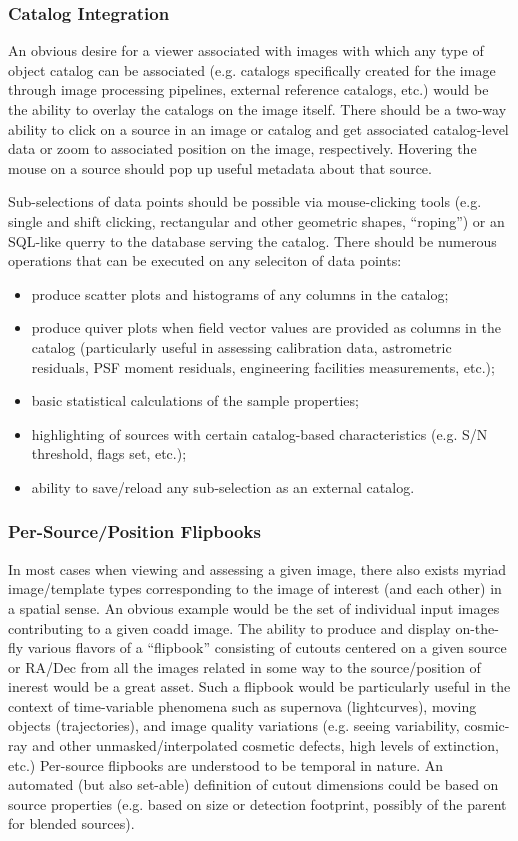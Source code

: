 \subsubsection{Catalog Integration}
An obvious desire for a viewer associated with images with which any type of object catalog can be associated (e.g. catalogs specifically created for the image through image processing pipelines, external reference catalogs, etc.) would be the ability to overlay the catalogs on the image itself.  There should be a two-way ability to click on a source in an image or catalog and get associated catalog-level data or zoom to associated position on the image, respectively.  Hovering the mouse on a source should pop up useful metadata about that source.

Sub-selections of data points should be possible via mouse-clicking tools (e.g. single and shift clicking, rectangular and other geometric shapes, ``roping'') or an SQL-like querry to the database serving the catalog.  There should be numerous operations that can be executed on any seleciton of data points:
\begin{itemize}
\item{produce scatter plots and histograms of any columns in the catalog;}
\item{produce quiver plots when field vector values are provided as columns in the catalog (particularly useful in assessing calibration data, astrometric residuals, PSF moment residuals, engineering facilities measurements, etc.);}
\item{basic statistical calculations of the sample properties;}
\item{highlighting of sources with certain catalog-based characteristics (e.g. S/N threshold, flags set, etc.);}
\item{ability to save/reload any sub-selection as an external catalog.}
\end{itemize}


\subsubsection{Per-Source/Position Flipbooks}
In most cases when viewing and assessing a given image, there also exists myriad image/template types corresponding to the image of interest (and each other) in a spatial sense.  An obvious example would be the set of individual input images contributing to a given coadd image.  The ability to produce and display on-the-fly various flavors of a ``flipbook'' consisting of cutouts centered on a given source or RA/Dec from all the images related in some way to the source/position of inerest would be a great asset.  Such a flipbook would be particularly useful in the context of time-variable phenomena such as supernova (lightcurves), moving objects (trajectories), and image quality variations (e.g. seeing variability, cosmic-ray and other unmasked/interpolated cosmetic defects, high levels of extinction, etc.)  Per-source flipbooks are understood to be temporal in nature.  An automated (but also set-able) definition of cutout dimensions could be based on source properties (e.g. based on size or detection footprint, possibly of the parent for blended sources).

